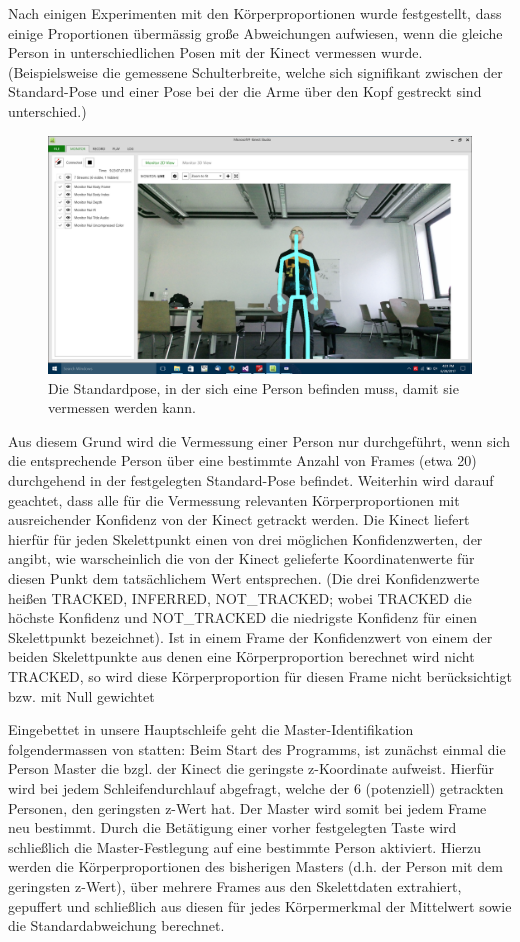 Nach einigen Experimenten mit den Körperproportionen wurde festgestellt, dass einige Proportionen übermässig große Abweichungen aufwiesen, wenn die gleiche Person in unterschiedlichen Posen mit der Kinect vermessen wurde. (Beispielsweise die gemessene Schulterbreite, welche sich signifikant zwischen der Standard-Pose und einer Pose bei der die Arme über den Kopf gestreckt sind unterschied.) 
\begin{figure}[h!]
		\centering
		\includegraphics[width=.8\textwidth]{pictures/standardpose_.png}
		\caption{Die Standardpose, in der sich eine Person befinden muss, damit sie vermessen werden kann.}\label{fig:standardp}
		\end{figure}
Aus diesem Grund wird die Vermessung einer Person nur durchgeführt, wenn sich die entsprechende Person über eine bestimmte Anzahl von Frames (etwa 20) durchgehend in der festgelegten Standard-Pose befindet. Weiterhin wird darauf geachtet, dass alle für die Vermessung relevanten Körperproportionen mit ausreichender Konfidenz von der Kinect getrackt werden. Die Kinect liefert hierfür für jeden Skelettpunkt einen von drei möglichen Konfidenzwerten, der angibt, wie warscheinlich die von der Kinect gelieferte Koordinatenwerte für diesen Punkt dem tatsächlichem Wert entsprechen. (Die drei Konfidenzwerte heißen TRACKED, INFERRED, NOT\_TRACKED; wobei TRACKED die höchste Konfidenz und NOT\_TRACKED die niedrigste Konfidenz für einen Skelettpunkt bezeichnet). Ist in einem Frame der Konfidenzwert von einem der beiden Skelettpunkte aus denen eine Körperproportion berechnet wird nicht TRACKED, so wird diese Körperproportion für diesen Frame nicht berücksichtigt bzw. mit Null gewichtet \par
Eingebettet in unsere Hauptschleife geht die Master-Identifikation folgendermassen von statten: Beim Start des Programms, ist zunächst einmal die Person Master die bzgl. der Kinect die geringste z-Koordinate aufweist. Hierfür wird bei jedem Schleifendurchlauf abgefragt, welche der 6 (potenziell) getrackten Personen, den geringsten z-Wert hat. Der Master wird somit bei jedem Frame neu bestimmt. Durch die Betätigung einer vorher festgelegten Taste wird schließlich die Master-Festlegung auf eine bestimmte Person aktiviert. Hierzu werden die Körperproportionen des bisherigen Masters (d.h. der Person mit dem geringsten z-Wert), über mehrere Frames aus den Skelettdaten extrahiert, gepuffert und schließlich aus diesen für jedes Körpermerkmal der Mittelwert sowie die Standardabweichung berechnet.
	
	
	